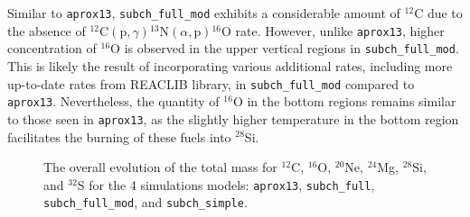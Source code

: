 \documentclass[preprint,times,tighten]{aastex631}
\begin{document}
Similar to {\tt aprox13}, {\tt subch\_full\_mod} exhibits a considerable amount of ${}^{12}$C due to the absence of ${}^{12}\mbox{C}(\mbox{p}, \gamma) {}^{13}\mbox{N}(\alpha, \mbox{p}){}^{16}\mbox{O}$ rate. However, unlike {\tt aprox13}, higher concentration of ${}^{16}$O is observed in the upper vertical regions in {\tt subch\_full\_mod}. This is likely the result of incorporating various additional rates, including more up-to-date rates from {\sf REACLIB} library, in {\tt subch\_full\_mod} compared to {\tt aprox13}. Nevertheless, the quantity of ${}^{16}$O in the bottom regions remains similar to those seen in {\tt aprox13}, as the slightly higher temperature in the bottom region facilitates the burning of these fuels into ${}^{28}$Si.

\begin{figure*}
    \centering
    \caption{\label{fig:network_species_summary} The overall evolution of the total mass for ${}^{12}$C, ${}^{16}$O, ${}^{20}$Ne, ${}^{24}$Mg, ${}^{28}$Si, and ${}^{32}$S for the 4 simulations models: {\tt aprox13}, {\tt subch\_full}, {\tt subch\_full\_mod}, and {\tt subch\_simple}.}
\end{figure*}
\end{document}
